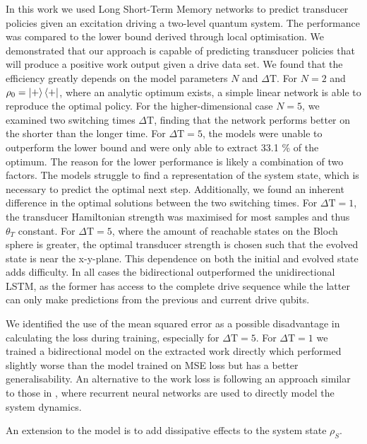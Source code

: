In this work we used Long Short-Term Memory networks to predict transducer policies given an excitation driving a two-level quantum system.
The performance was compared to the lower bound derived through local optimisation.
We demonstrated that our approach is capable of predicting transducer policies that will produce a positive work output given a drive data set.
We found that the efficiency greatly depends on the model parameters $N$ and $\Delta \mathrm{T}$.
For $N=2$ and $\rho_0 = \ket{+}\bra{+}$, where an analytic optimum exists, a simple linear network is able to reproduce the optimal policy.
For the higher-dimensional case $N=5$, we examined two switching times $\Delta \mathrm{T}$, finding that the network performs better on the shorter than the longer time.
For $\Delta \mathrm{T} = 5$, the models were unable to outperform the lower bound and were only able to extract 33.1 \% of the optimum.
The reason for the lower performance is likely a combination of two factors.
The models struggle to find a representation of the system state, which is necessary to predict the optimal next step.
Additionally, we found an inherent difference in the optimal solutions between the two switching times. For $\Delta \mathrm{T} = 1$, the transducer Hamiltonian strength was maximised for most samples and thus $\theta_T$ constant.
For $\Delta \mathrm{T} = 5$, where the amount of reachable states on the Bloch sphere is greater, the optimal transducer strength is chosen such that the evolved state is near the x-y-plane.
This dependence on both the initial and evolved state adds difficulty.
In all cases the bidirectional outperformed the unidirectional LSTM, as the former has access to the complete drive sequence while the latter can only make predictions from the previous and current drive qubits.

We identified the use of the mean squared error as a possible disadvantage in calculating the loss during training, especially for $\Delta \mathrm{T} = 5$.
For $\Delta \mathrm{T} = 1$ we trained a bidirectional model on the extracted work directly which performed slightly worse than the model trained on MSE loss but has a better generalisability.
An alternative to the work loss is following an approach similar to those in \cite{Banchi_2018, PhysRevX.10.011006}, where recurrent neural networks are used to directly model the system dynamics.

An extension to the model is to add dissipative effects to the system state $\rho_S$.

